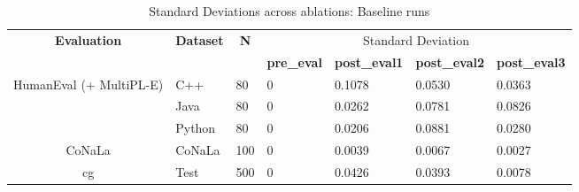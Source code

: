\begin{table}[H]
\centering
\caption{Standard Deviations across ablations: Baseline runs}
\begin{tabular}{|c|l|l|llll|}
\hline
\multirow{2}{*}{\textbf{Evaluation}}       & \multicolumn{1}{c|}{\multirow{2}{*}{\textbf{Dataset}}} & \multicolumn{1}{c|}{\multirow{2}{*}{\textbf{N}}} & \multicolumn{4}{c|}{Standard   Deviation}                                                                                                              \\ \cline{4-7} 
                                           & \multicolumn{1}{c|}{}                                  & \multicolumn{1}{c|}{}                            & \multicolumn{1}{l|}{\textbf{pre\_eval}} & \multicolumn{1}{l|}{\textbf{post\_eval1}} & \multicolumn{1}{l|}{\textbf{post\_eval2}} & \textbf{post\_eval3} \\ \hline
\multirow{3}{*}{HumanEval   (+ MultiPL-E)} & C++                                                    & 80                                               & \multicolumn{1}{l|}{0}                  & \multicolumn{1}{l|}{0.1078}               & \multicolumn{1}{l|}{0.0530}               & 0.0363               \\ \cline{2-7} 
                                           & Java                                                   & 80                                               & \multicolumn{1}{l|}{0}                  & \multicolumn{1}{l|}{0.0262}               & \multicolumn{1}{l|}{0.0781}               & 0.0826               \\ \cline{2-7} 
                                           & Python                                                 & 80                                               & \multicolumn{1}{l|}{0}                  & \multicolumn{1}{l|}{0.0206}               & \multicolumn{1}{l|}{0.0881}               & 0.0280               \\ \hline
CoNaLa                                     & CoNaLa                                                 & 100                                              & \multicolumn{1}{l|}{0}                  & \multicolumn{1}{l|}{0.0039}               & \multicolumn{1}{l|}{0.0067}               & 0.0027               \\ \hline
\multirow{2}{*}{cg}                        & Test                                                   & 500                                              & \multicolumn{1}{l|}{0}                  & \multicolumn{1}{l|}{0.0426}               & \multicolumn{1}{l|}{0.0393}               & 0.0078               \\ \cline{2-7} 

\end{tabular}
\end{table}
